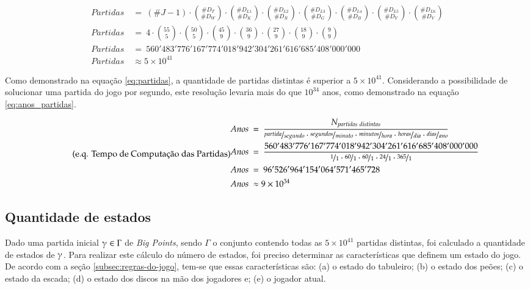  \begin{equation}
	 \label{eq:partidas}
	 \tag{e.q. Quantidades de Partidas Distintas}
 \begin{split}
 Partidas\ &=\  (\#J-1) \cdot \binom{\#D_T}{\#D_W} \cdot \binom{\#D_{L1}}{\#D_K} \cdot \binom{\#D_{L2}}{\#D_R} \cdot \binom{\#D_{L3}}{\#D_G} \cdot \binom{\#D_{L4}}{\#D_B} \cdot \binom{\#D_{L5}}{\#D_Y} \cdot \binom{\#D_{L6}}{\#D_V}\\
 Partidas\ &=\  4\cdot \binom{55}{5} \cdot \binom{50}{5} \cdot \binom{45}{9} \cdot \binom{36}{9} \cdot \binom{27}{9} \cdot \binom{18}{9} \cdot \binom{9}{9}\\
 Partidas\ &=\ 560'483'776'167'774'018'942'304'261'616'685'408'000'000\\
 Partidas\ &\approx 5\times 10^{41}
 \end{split}
 \end{equation}

Como demonstrado na equação \ref{eq:partidas}, a quantidade de partidas distintas é superior a $5\times 10^{41}$. Considerando a possibilidade de solucionar uma partida do jogo por segundo, este resolução levaria mais do que $10^{34}$ anos, como demonstrado na equação \ref{eq:anos_partidas}.

 \begin{equation} \label{eq:anos_partidas} \tag{e.q. Tempo de Computação das Partidas}
 \begin{split}
 Anos\ &=\ \dfrac{N_{partidas\ distintas}}{\nicefrac{partida}{segundo}\cdot\nicefrac{segundos}{minuto}\cdot\nicefrac{minutos}{hora}\cdot\nicefrac{horas}{dia}\cdot\nicefrac{dias}{ano}}\\
 Anos\ &=\ \dfrac{560'483'776'167'774'018'942'304'261'616'685'408'000'000}{\nicefrac{1}{1}\cdot\nicefrac{60}{1}\cdot\nicefrac{60}{1}\cdot\nicefrac{24}{1}\cdot\nicefrac{365}{1}}\\
 Anos\ &=\ 96'526'964'154'064'571'465'728\\
 Anos\ &\approx 9\times 10^{34}
 \end{split}
 \end{equation}

\subsection{Quantidade de estados}
\label{subsec:quantidade-de-estados}

Dado uma partida inicial $\gammaup \in \Gamma$ de \emph{Big Points}, sendo $\Gamma$ o conjunto contendo todas as $5\times 10^{41}$ partidas distintas, foi calculado a quantidade de estados de $\gammaup$. Para realizar este cálculo do número de estados, foi preciso determinar as características que definem um estado do jogo. De acordo com a seção \ref{subsec:regras-do-jogo}, tem-se que essas características são: (a) o estado do tabuleiro; (b) o estado dos peões; (c) o estado da escada; (d) o estado dos discos na mão dos jogadores e; (e) o jogador atual.


